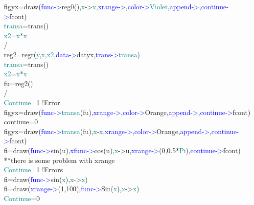 \begin{example}[drawex]
figyx=\textcolor{VioletRed}{draw}(\textcolor{blue}{func->}reg0(),\textcolor{teal}{x}->\textcolor{teal}{x},\textcolor{blue}{xrange->},\textcolor{blue}{color->}\textcolor{teal}{Violet},\textcolor{blue}{append->},\textcolor{blue}{continue->}fcont)\\ 
\textcolor{teal}{transa}=\textcolor{VioletRed}{trans}()\\ 
\textcolor{teal}{x2}=\textcolor{teal}{x}*\textcolor{teal}{x}\\ 
/                                                           \\ 
reg2=\textcolor{VioletRed}{regr}(\textcolor{teal}{y},\textcolor{teal}{x},\textcolor{teal}{x2},\textcolor{blue}{data->}datyx,\textcolor{blue}{trans->}\textcolor{teal}{transa})\\ 
\textcolor{teal}{transa}=\textcolor{VioletRed}{trans}()\\ 
\textcolor{teal}{x2}=\textcolor{teal}{x}*\textcolor{teal}{x}\\ 
fu=reg2()\\ 
/        \\ 
\textcolor{teal}{Continue}=1\,\,{\color{ForestGreen}!Error}\\ 
figyx=\textcolor{VioletRed}{draw}(\textcolor{blue}{func->}\textcolor{teal}{transa}(fu),\textcolor{blue}{xrange->},\textcolor{blue}{color->}Orange,\textcolor{blue}{append->},\textcolor{blue}{continue->}fcont)\\ 
continue=0\\ 
figyx=\textcolor{VioletRed}{draw}(\textcolor{blue}{func->}\textcolor{teal}{transa}(fu),\textcolor{teal}{x}-\textcolor{teal}{x},\textcolor{blue}{xrange->},\textcolor{blue}{color->}Orange,\textcolor{blue}{append->},\textcolor{blue}{continue->}fcont)\\ 
fi=\textcolor{VioletRed}{draw}(\textcolor{blue}{func->}\textcolor{VioletRed}{sin}(u),\textcolor{blue}{xfunc->}\textcolor{VioletRed}{cos}(u),\textcolor{teal}{x}->u,\textcolor{blue}{xrange->}(0,0.5*\textcolor{teal}{Pi}),\textcolor{blue}{continue->}fcont)\\ 
{\color{ForestGreen}**there is some problem with xrange}\\ 
\textcolor{teal}{Continue}=1\,\,{\color{ForestGreen}!Errors}\\ 
fi=\textcolor{VioletRed}{draw}(\textcolor{blue}{func->}\textcolor{VioletRed}{sin}(\textcolor{teal}{x}),\textcolor{teal}{x}->\textcolor{teal}{x})\\ 
fi=\textcolor{VioletRed}{draw}(\textcolor{blue}{xrange->}(1,100),\textcolor{blue}{func->}Sin(\textcolor{teal}{x}),\textcolor{teal}{x}->\textcolor{teal}{x})\\ 
\textcolor{teal}{Continue}=0\\ 
\end{example} 
